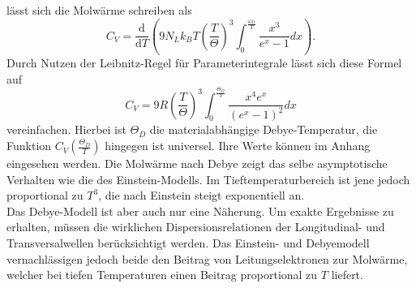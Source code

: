 lässt sich die Molwärme schreiben als
\begin{equation}
  C_V = \frac{\mathrm{d}}{\mathrm{d}T} \left( 9N_L k_BT \left(\frac{T}{\Theta}\right)^3 \int_{0}^{\frac{\omega_D}{T}}\frac{x^3}{e^x-1}dx\right).
\end{equation}
Durch Nutzen der Leibnitz-Regel für Parameterintegrale lässt sich diese Formel auf
\begin{equation}
  C_V = 9R \left(\frac{T}{\Theta}\right)^3 \int_{0}^{\frac{\Theta_D}{T}} \frac{x^4e^x}{\left(e^x-1\right)^2}dx
\end{equation}
vereinfachen.
Hierbei ist $\Theta_D$ die materialabhängige Debye-Temperatur, die Funktion $C_V\left(\frac{\Theta_D}{T}\right)$ hingegen ist universel.
Ihre Werte können im Anhang eingesehen werden.
Die Molwärme nach Debye zeigt das selbe asymptotische Verhalten wie die des Einstein-Modells.
Im Tieftemperaturbereich ist jene jedoch proportional zu $T^3$, die nach Einstein steigt exponentiell an.\\
Das Debye-Modell ist aber auch nur eine Näherung.
Um exakte Ergebnisse zu erhalten, müssen die wirklichen Dispersionsrelationen der Longitudinal- und Transversalwellen berücksichtigt werden.
Das Einstein- und Debyemodell vernachlässigen jedoch beide den Beitrag von Leitungselektronen zur Molwärme, welcher bei tiefen Temperaturen einen Beitrag proportional zu $T$ liefert.
